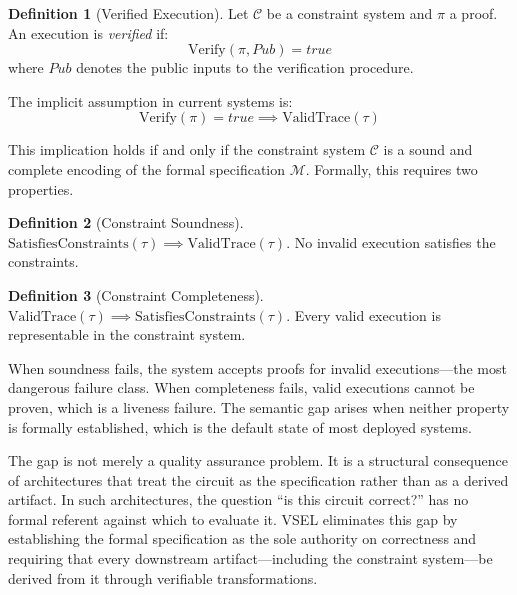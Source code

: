 \documentclass[11pt,a4paper]{article}
\theoremstyle{definition}
\newtheorem{definition}{Definition}[section]
\newcommand{\Verify}{\mathrm{Verify}}
\newcommand{\ValidTrace}{\mathrm{ValidTrace}}
\newcommand{\SatisfiesConstraints}{\mathrm{SatisfiesConstraints}}
\begin{document}
\begin{definition}[Verified Execution]
\label{def:verified-execution}
Let $\mathcal{C}$ be a constraint system and $\pi$ a proof. An execution is \emph{verified} if:
\begin{equation}
\Verify(\pi, \mathit{Pub}) = \mathit{true}
\end{equation}
where $\mathit{Pub}$ denotes the public inputs to the verification procedure.
\end{definition}

The implicit assumption in current systems is:
\begin{equation}
\label{eq:false-assumption}
\Verify(\pi) = \mathit{true} \implies \ValidTrace(\tau)
\end{equation}

This implication holds if and only if the constraint system $\mathcal{C}$ is a sound and complete encoding of the formal specification $\mathcal{M}$. Formally, this requires two properties.

\begin{definition}[Constraint Soundness]
\label{def:constraint-soundness}
$\SatisfiesConstraints(\tau) \implies \ValidTrace(\tau)$. No invalid execution satisfies the constraints.
\end{definition}

\begin{definition}[Constraint Completeness]
\label{def:constraint-completeness}
$\ValidTrace(\tau) \implies \SatisfiesConstraints(\tau)$. Every valid execution is representable in the constraint system.
\end{definition}

When soundness fails, the system accepts proofs for invalid executions---the most dangerous failure class. When completeness fails, valid executions cannot be proven, which is a liveness failure. The semantic gap arises when neither property is formally established, which is the default state of most deployed systems.

The gap is not merely a quality assurance problem. It is a structural consequence of architectures that treat the circuit as the specification rather than as a derived artifact. In such architectures, the question ``is this circuit correct?'' has no formal referent against which to evaluate it. VSEL eliminates this gap by establishing the formal specification as the sole authority on correctness and requiring that every downstream artifact---including the constraint system---be derived from it through verifiable transformations.
\end{document}
